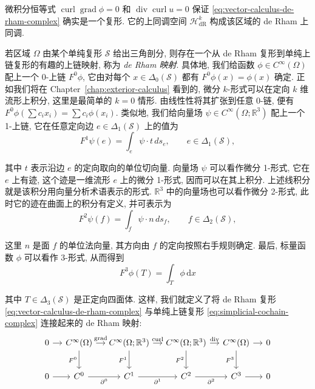 微积分恒等式 $\operatorname{curl}\operatorname{grad}\phi=0$ 和 $\operatorname{div}\operatorname{curl}u=0$ 保证 \eqref{eq:vector-calculus-de-rham-complex} 确实是一个复形. 它的上同调空间 $\mathcal H^k_{\mathrm{dR}}$ 构成该区域的 de Rham 上同调.

若区域 $\Omega$ 由某个单纯复形 $\mathcal S$ 给出三角剖分, 则存在一个从 de Rham 复形到单纯上链复形的有趣的上链映射, 称为 \emph{de Rham 映射}. 具体地, 我们给函数 $\phi\in C^\infty(\Omega)$ 配上一个 0-上链 $F^0\phi$, 它由对每个 $x\in\Delta_0(\mathcal S)$ 都有 $F^0\phi(x)=\phi(x)$ 确定. 正如我们将在 Chapter~\ref{chap:exterior-calculus} 看到的, 微分 $k$-形式可以在定向 $k$ 维流形上积分, 这里是最简单的 $k=0$ 情形. 由线性性将其扩张到任意 0-链, 便有 $F^0\phi(\sum c_ix_i)=\sum c_i\phi(x_i)$. 类似地, 我们给向量场 $\psi\in C^\infty(\Omega;\mathbb R^3)$ 配上一个 1-上链, 它在任意定向边 $e\in\Delta_1(\mathcal S)$ 上的值为
\[
F^1\psi(e)=\int_e\psi\cdot t\,ds_e,\qquad e\in\Delta_1(\mathcal S),
\]

其中 $t$ 表示沿边 $e$ 的定向取向的单位切向量. 向量场 $\psi$ 可以看作微分 1-形式, 它在 $e$ 上有迹, 这个迹是一维流形 $e$ 上的微分 1-形式, 因而可以在其上积分. 上述线积分就是该积分用向量分析术语表示的形式. $\mathbb R^3$ 中的向量场也可以看作微分 2-形式, 此时它的迹在曲面上的积分有定义, 并可表示为
\[
F^2\psi(f)=\int_f\psi\cdot n\,ds_f,\qquad f\in\Delta_2(\mathcal S),
\]

这里 $n$ 是面 $f$ 的单位法向量, 其方向由 $f$ 的定向按照右手规则确定. 最后, 标量函数 $\phi$ 可以看作 3-形式, 从而得到
\[
F^3\phi(T)=\int_T\phi\,\mathrm{d}x
\]

其中 $T\in\Delta_3(\mathcal S)$ 是正定向四面体. 这样, 我们就定义了将 de Rham 复形 \eqref{eq:vector-calculus-de-rham-complex} 与单纯上链复形 \eqref{eq:simplicial-cochain-complex} 连接起来的 de Rham 映射:
\begin{equation}\label{eq:de-rham-commuting-map}
\begin{tikzcd}[column sep=1.1em,row sep=2.2em]
0 \arrow[r] & C^\infty(\Omega) \arrow[r,"\operatorname{grad}"] \arrow[d,"F^0"'] & C^\infty(\Omega;\mathbb R^3) \arrow[r,"\operatorname{curl}"] \arrow[d,"F^1"'] & C^\infty(\Omega;\mathbb R^3) \arrow[r,"\operatorname{div}"] \arrow[d,"F^2"'] & C^\infty(\Omega) \arrow[r] \arrow[d,"F^3"'] & 0 \\
0 \arrow[r] & C^0 \arrow[r,"\partial^0"'] & C^1 \arrow[r,"\partial^1"'] & C^2 \arrow[r,"\partial^2"'] & C^3 \arrow[r] & 0
\end{tikzcd}
\end{equation}

